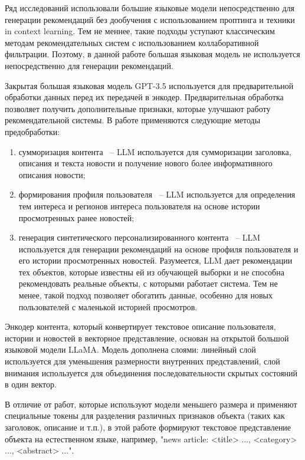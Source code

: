 Ряд исследований использовали большие языковые модели непосредственно для генерации рекомендаций без дообучения с использованием проптинга и техники in context learning. Тем не меннее, такие подходы уступают классическим методам рекомендательных систем с использованием коллаборативной фильтрации. Поэтому, в данной работе большая языковая модель не используется непосредственно для генерации рекомендаций.

Закрытая большая языковая модель GPT-3.5 используется для предварительной обработки данных перед их передачей в энкодер. Предварительная обработка позволяет получить дополнительные признаки, которые улучшают работу рекомендательной системы. В работе применяются следующие методы предобработки:
\begin{enumerate}
    \item сумморизация контента ~-- LLM используется для сумморизации заголовка, описания и текста новости и получение нового более информативного описания новости;
    \item формирования профиля пользователя ~-- LLM используется для определения тем интереса и регионов интереса пользователя на основе истории просмотренных ранее новостей;
    \item генерация синтетического персонализированного контента ~-- LLM используется для генерации рекомендаций на основе профиля пользователя и его истории просмотренных новостей. Разумеется, LLM дает рекомендации тех объектов, которые известны ей из обучающей выборки и не способна рекомендовать реальные объекты, с которыми работает система. Тем не менее, такой подход позволяет обогатить данные, особенно для новых пользователей с маленькой историей просмотров.
\end{enumerate}

Энкодер контента, который конвертирует текстовое описание пользователя, истории и новостей в векторное представление, основан на открытой большой языковой модели LLaMA. Модель дополнена слоями: линейный слой используется для уменьшения размерности внутренних представлений, слой внимания используется для объединения последовательности скрытых состояний в один вектор.

В отличие от работ, которые используют модели меньшего размера и применяют специальные токены для разделения различных признаков объекта (таких как заголовок, описание и т.п.), в этой работе формируют текстовое представление объекта на естественном языке, например, "news article: <title> ..., <category> ..., <abstract> ...".


